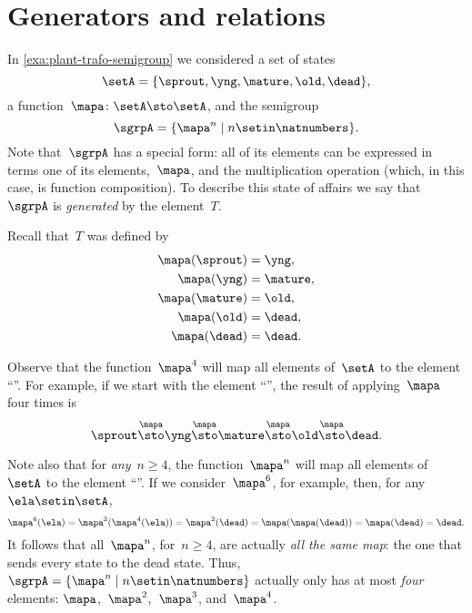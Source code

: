 
\section{Generators and relations}

In \cref{exa:plant-trafo-semigroup} we considered a set of states
%
\begin{equation}
    \setA= \{ \sprout, \yng, \mature, \old, \dead \},
\end{equation}
%
a function~$\mapa \colon \setA \sto \setA$, and the semigroup
%
\begin{equation}
    \label{eq:trafo-sgrp-one-gen}
    \sgrpA = \{ \mapa^n \mid n \setin \natnumbers \}.
\end{equation}
%
Note that~$\sgrpA$ has a special form: all of its elements can be expressed in terms one of its elements,~$\mapa$, and the multiplication operation (which, in this case, is function composition).
To describe this state of affairs we say that~$\sgrpA$ is \emph{generated} by the element~$T$.

Recall that~$T$ was defined by
%
\begin{align*}
    \mapa(\sprout) & =  \yng, \\
    \mapa(\yng)    & =  \mature, \\
    \mapa(\mature) & =  \old, \\
    \mapa( \old)   & = \dead, \\
    \mapa(\dead)   & = \dead.
\end{align*}

Observe that the function~$\mapa^4$ will map all elements of~$\setA$ to the element ``\dead''.
For example, if we start with the element ``\sprout'', the result of applying~$\mapa$ four times is
%
\begin{equation*}
    \sprout \overset{\mapa}{\sto} \yng \overset{\mapa}{\sto} \mature \overset{\mapa}{\sto} \old \overset{\mapa}{\sto} \dead.
\end{equation*}

Note also that for \emph{any}~$n \geq 4$, the function~$\mapa^n$ will map all elements of~$\setA$ to the element ``\dead''.
If we consider~$\mapa^6$, for example, then, for any~$\ela \setin \setA$,
%
\begin{equation*}
    \mapa^6(\ela) = \mapa^2(\mapa^4(\ela)) = \mapa^2(\dead) = \mapa(\mapa(\dead)) = \mapa(\dead) = \dead.
\end{equation*}
%
It follows that all~$\mapa^n$, for~$n \geq 4$, are actually \emph{all the same map}: the one that sends every state to the dead state.
Thus, ~$\sgrpA = \{ \mapa^n \mid n \setin \natnumbers \}$ actually only has at most \emph{four} elements: $\mapa$,~$\mapa^2$,~$\mapa^3$, and~$\mapa^4$.

